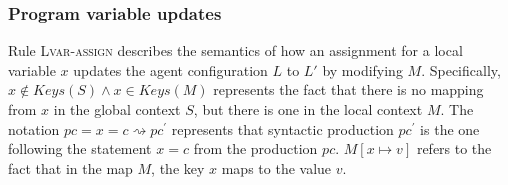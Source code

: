 \subsubsection{Program variable updates}
Rule \textsc{Lvar-assign} describes the semantics of how an assignment for a local variable $x$ updates the agent configuration $L$ to $L'$ by modifying $M$. Specifically, $x\notin \mathit{Keys}(S) \wedge x \in \mathit{Keys(M)}$ represents the fact that there is no mapping from $x$ in the global context $S$, but there is one in the local context $M$. The notation $\mathit{pc} = x = c \rightsquigarrow \mathit{pc}^\prime$ represents that syntactic production $\mathit{pc}^\prime$ is the one following the statement $x = c$ from the production $\mathit{pc}$. $M[x\mapsto v]$ refers to the fact that in the map $M$, the key $x$ maps to the value $v$. 
\vspace{2pt}
\begin{mdframed}
\scriptsize
{}
\end{mdframed}

\noindent
